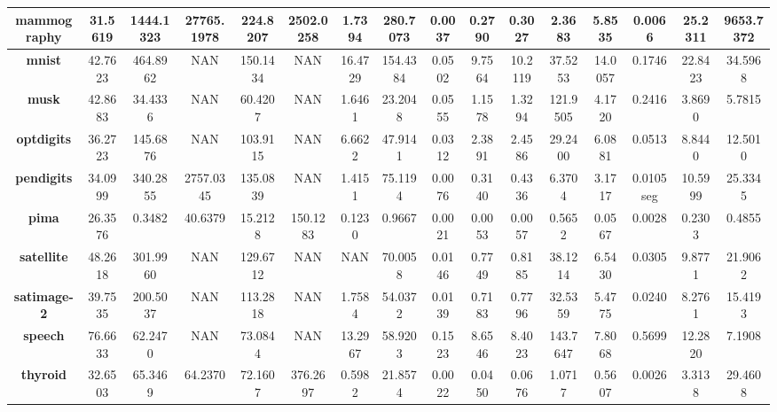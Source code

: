 \begin{table}
{\begin{tabular}{|c|c|c|c|c|c|c|c|c|c|c|c|c|c|c|c|}
		\textbf{mammography}      & 31.5619      & 1444.1323 & 27765.1978  & 224.8207  & 2502.0258 & 1.7394    & 280.7073 & 0.0037    & 0.2790   & 0.3027   & 2.3683   & 5.8535     & 0.0066   & 25.2311  & 9653.7372 \\ \hline
		\textbf{mnist}            & 42.7623      & 464.8962  & NAN             & 150.1434  & NAN           & 16.4729   & 154.4384 & 0.0502    & 9.7564   & 10.2119  & 37.5253  & 14.0057    & 0.1746   & 22.8423  & 34.5968   \\ \hline
		\textbf{musk}             & 42.8683      & 34.4336   & NAN             & 60.4207   & NAN           & 1.6461    & 23.2048  & 0.0555    & 1.1578   & 1.3294   & 121.9505 & 4.1720     & 0.2416   & 3.8690   & 5.7815    \\ \hline
		\textbf{optdigits}        & 36.2723      & 145.6876  & NAN             & 103.9115  & NAN           & 6.6622    & 47.9141  & 0.0312    & 2.3891   & 2.4586   & 29.2400  & 6.0881     & 0.0513   & 8.8440   & 12.5010   \\ \hline
		\textbf{pendigits}        & 34.0999      & 340.2855  & 2757.0345   & 135.0839  & NAN           & 1.4151    & 75.1194  & 0.0076    & 0.3140   & 0.4336   & 6.3704   & 3.1717     & 0.0105 seg   & 10.5999  & 25.3345   \\ \hline
		\textbf{pima}             & 26.3576      & 0.3482    & 40.6379     & 15.2128   & 150.1283  & 0.1230    & 0.9667   & 0.0021    & 0.0053   & 0.0057   & 0.5652   & 0.0567     & 0.0028   & 0.2303   & 0.4855    \\ \hline
		\textbf{satellite}        & 48.2618      & 301.9960  & NAN             & 129.6712  & NAN           & NAN           & 70.0058  & 0.0146    & 0.7749   & 0.8185   & 38.1214  & 6.5430     & 0.0305   & 9.8771   & 21.9062   \\ \hline
		\textbf{satimage-2}       & 39.7535      & 200.5037  & NAN             & 113.2818  & NAN           & 1.7584    & 54.0372  & 0.0139    & 0.7183   & 0.7796   & 32.5359  & 5.4775     & 0.0240   & 8.2761   & 15.4193   \\ \hline
		\textbf{speech}           & 76.6633      & 62.2470   & NAN             & 73.0844   & NAN           & 13.2967   & 58.9203  & 0.1523    & 8.6546   & 8.4023   & 143.7647 & 7.8068     & 0.5699   & 12.2820  & 7.1908    \\ \hline
		\textbf{thyroid}          & 32.6503      & 65.3469   & 64.2370     & 72.1607  & 376.2697  & 0.5982    & 21.8574  & 0.0022    & 0.0450   & 0.0676   & 1.0717   & 0.5607     & 0.0026   & 3.3138   & 29.4608   \\ \hline

\end{tabular}}
\end{table}
